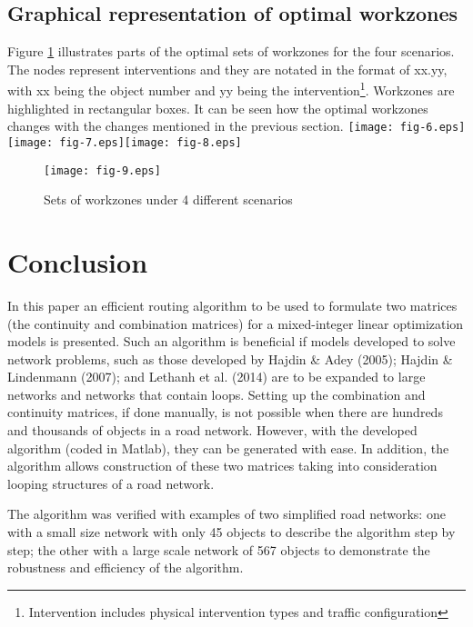 \documentclass[10pt]{article}
\begin{document}
\subsection{Graphical representation of optimal workzones}

Figure \ref{fig:6} illustrates parts of the optimal sets of workzones for the
four scenarios. The nodes represent interventions and they are notated in the
format of xx.yy, with xx being the object number and yy being the
intervention\footnote{Intervention includes physical intervention types and
traffic configuration}. Workzones are highlighted in rectangular boxes. It can be
seen how the optimal workzones changes with the changes mentioned in the previous
section.
\texttt{[image: fig-6.eps]}\texttt{[image: fig-7.eps]}\texttt{[image: fig-8.eps]}
\begin{figure}[h]
\begin{center}
\texttt{[image: fig-9.eps]}
\caption{Sets of workzones under 4 different scenarios}\label{fig:6}
\end{center}
\end{figure}

\pagebreak{}

\section{Conclusion}

In this paper an efficient routing algorithm to be used to formulate two
matrices (the continuity and combination matrices) for a mixed-integer linear
optimization models is presented. Such an algorithm is beneficial if models
developed to solve network problems, such as those developed by Hajdin \& Adey
(2005); Hajdin \& Lindenmann (2007); and Lethanh et al. (2014) are to be expanded
to large networks and networks that contain loops. Setting up the combination and
continuity matrices, if done manually, is not possible when there are hundreds
and thousands of objects in a road network. However, with the developed algorithm
(coded in Matlab), they can be generated with ease. In addition, the algorithm
allows construction of these two matrices taking into consideration looping
structures of a road network.

The algorithm was verified with examples of two simplified road networks: one
with a small size network with only 45 objects to describe the algorithm step by
step; the other with a large scale network of 567 objects to demonstrate the
robustness and efficiency of the algorithm.
\end{document}
